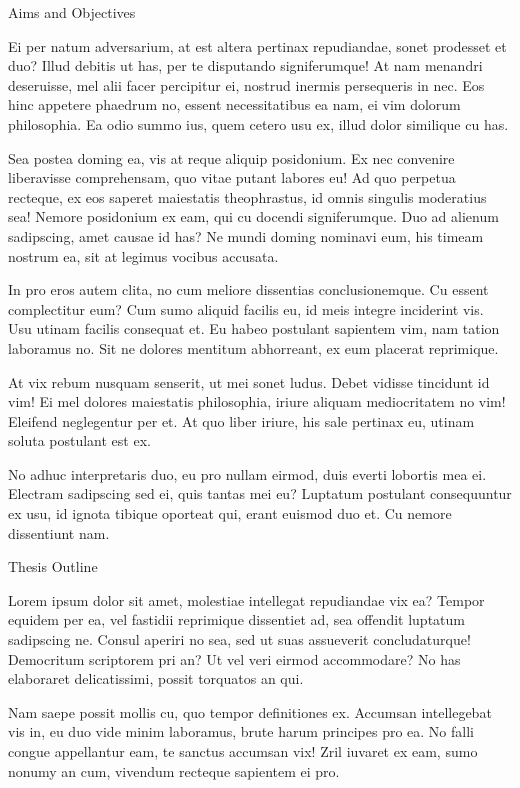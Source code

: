 \begin{introduction}
\begin{section}{Aims and Objectives}
{    Ei per natum adversarium, at est altera pertinax repudiandae, sonet prodesset et duo? Illud debitis ut has, per te disputando signiferumque! At nam menandri deseruisse, mel alii facer percipitur ei, nostrud inermis persequeris in nec. Eos hinc appetere phaedrum no, essent necessitatibus ea nam, ei vim dolorum philosophia. Ea odio summo ius, quem cetero usu ex, illud dolor similique cu has.
    
    Sea postea doming ea, vis at reque aliquip posidonium. Ex nec convenire liberavisse comprehensam, quo vitae putant labores eu! Ad quo perpetua recteque, ex eos saperet maiestatis theophrastus, id omnis singulis moderatius sea! Nemore posidonium ex eam, qui cu docendi signiferumque. Duo ad alienum sadipscing, amet causae id has? Ne mundi doming nominavi eum, his timeam nostrum ea, sit at legimus vocibus accusata.
    
    In pro eros autem clita, no cum meliore dissentias conclusionemque. Cu essent complectitur eum? Cum sumo aliquid facilis eu, id meis integre inciderint vis. Usu utinam facilis consequat et. Eu habeo postulant sapientem vim, nam tation laboramus no. Sit ne dolores mentitum abhorreant, ex eum placerat reprimique.
    
    At vix rebum nusquam senserit, ut mei sonet ludus. Debet vidisse tincidunt id vim! Ei mel dolores maiestatis philosophia, iriure aliquam mediocritatem no vim! Eleifend neglegentur per et. At quo liber iriure, his sale pertinax eu, utinam soluta postulant est ex.
    
    No adhuc interpretaris duo, eu pro nullam eirmod, duis everti lobortis mea ei. Electram sadipscing sed ei, quis tantas mei eu? Luptatum postulant consequuntur ex usu, id ignota tibique oporteat qui, erant euismod duo et. Cu nemore dissentiunt nam.

}
\end{section}
\begin{section}{Thesis Outline}
{
    Lorem ipsum dolor sit amet, molestiae intellegat repudiandae vix ea? Tempor equidem per ea, vel fastidii reprimique dissentiet ad, sea offendit luptatum sadipscing ne. Consul aperiri no sea, sed ut suas assueverit concludaturque! Democritum scriptorem pri an? Ut vel veri eirmod accommodare? No has elaboraret delicatissimi, possit torquatos an qui.

Nam saepe possit mollis cu, quo tempor definitiones ex. Accumsan intellegebat vis in, eu duo vide minim laboramus, brute harum principes pro ea. No falli congue appellantur eam, te sanctus accumsan vix! Zril iuvaret ex eam, sumo nonumy an cum, vivendum recteque sapientem ei pro.

}
\end{section}
\end{introduction}
